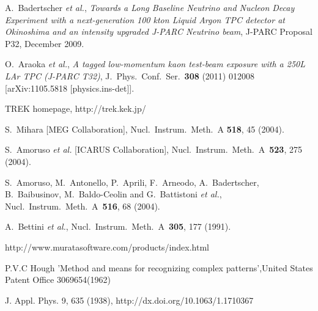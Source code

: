 \documentclass[final,3p,times,twocolumn]{elsarticle}
\begin{document}
\begin{thebibliography}{00}
A.~Badertscher {\it et al.}, \emph{Towards a Long Baseline Neutrino and Nucleon Decay Experiment with a next-generation 100 kton Liquid Argon TPC detector at Okinoshima and an intensity upgraded J-PARC Neutrino beam}, J-PARC Proposal P32, December 2009. 

  O.~Araoka {\it et al.},
  \emph {A tagged low-momentum kaon test-beam exposure with a 250L LAr TPC (J-PARC T32)}, J.\ Phys.\ Conf.\ Ser.\  {\bf 308} (2011) 012008 [arXiv:1105.5818 [physics.ins-det]].

  TREK homepage, http://trek.kek.jp/

S.~Mihara [MEG Collaboration],
Nucl.\ Instrum.\ Meth.\ A {\bf 518}, 45 (2004).

  S.~Amoruso {\it et al.} [ICARUS Collaboration],
  Nucl.\ Instrum.\ Meth.\ A\ {\bf 523}, 275  (2004).

  S.~Amoruso, M.~Antonello, P.~Aprili, F.~Arneodo, A.~Badertscher, B.~Baibusinov, M.~Baldo-Ceolin and G.~Battistoni {\it et al.},
  Nucl.\ Instrum.\ Meth.\ A\ {\bf 516}, 68  (2004).

  A.~Bettini {\it et al.}, Nucl.\ Instrum.\ Meth.\ A\ {\bf 305}, 177 (1991).

http://www.muratasoftware.com/products/index.html

  P.V.C Hough 'Method and means for recognizing complex patterns',United States Patent Office 3069654(1962) 

  J. Appl. Phys. 9, 635 (1938), http://dx.doi.org/10.1063/1.1710367

\end{thebibliography}
\end{document}
